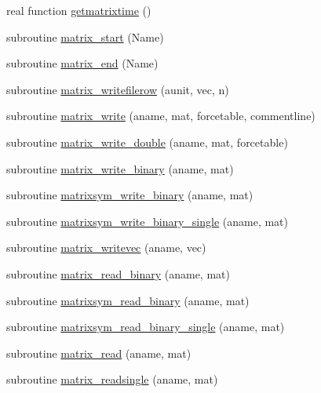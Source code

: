 \begin{DoxyCompactItemize}
\item 
real function \mbox{\hyperlink{namespacematrixutils_a969773017c47f3dc8dfb2a18e5bc5fbd}{getmatrixtime}} ()
\item 
subroutine \mbox{\hyperlink{namespacematrixutils_a24fd4fc8dbd7eee3c9176c3f9ca634eb}{matrix\+\_\+start}} (Name)
\item 
subroutine \mbox{\hyperlink{namespacematrixutils_aeb25ca6b661aed4516c029f0cd6003bc}{matrix\+\_\+end}} (Name)
\item 
subroutine \mbox{\hyperlink{namespacematrixutils_a88175f31021d0939c32287595d3f5630}{matrix\+\_\+writefilerow}} (aunit, vec, n)
\item 
subroutine \mbox{\hyperlink{namespacematrixutils_af21f52b4eeb7fc47bb9cd5e35cc1ebc8}{matrix\+\_\+write}} (aname, mat, forcetable, commentline)
\item 
subroutine \mbox{\hyperlink{namespacematrixutils_aa5eb3cbf41718ad7ccb335e642a29174}{matrix\+\_\+write\+\_\+double}} (aname, mat, forcetable)
\item 
subroutine \mbox{\hyperlink{namespacematrixutils_a5897a3508757971da56e07e3cdab7f0a}{matrix\+\_\+write\+\_\+binary}} (aname, mat)
\item 
subroutine \mbox{\hyperlink{namespacematrixutils_ac49e65871c4266da9c687b474d1908d8}{matrixsym\+\_\+write\+\_\+binary}} (aname, mat)
\item 
subroutine \mbox{\hyperlink{namespacematrixutils_acbfa12c533184738072f7f9a35e7cfc7}{matrixsym\+\_\+write\+\_\+binary\+\_\+single}} (aname, mat)
\item 
subroutine \mbox{\hyperlink{namespacematrixutils_a122e85102b3eac4266a8031c62de9bbf}{matrix\+\_\+writevec}} (aname, vec)
\item 
subroutine \mbox{\hyperlink{namespacematrixutils_a311afaea7a3204cc1b47a2adb7bebe63}{matrix\+\_\+read\+\_\+binary}} (aname, mat)
\item 
subroutine \mbox{\hyperlink{namespacematrixutils_a7572f4e0a0c8b958126d5d3c8b46f16a}{matrixsym\+\_\+read\+\_\+binary}} (aname, mat)
\item 
subroutine \mbox{\hyperlink{namespacematrixutils_a592726195f2a952a006391bde92cd2b0}{matrixsym\+\_\+read\+\_\+binary\+\_\+single}} (aname, mat)
\item 
subroutine \mbox{\hyperlink{namespacematrixutils_ac778ea47bab010c70f3d6f00838e4668}{matrix\+\_\+read}} (aname, mat)
\item 
subroutine \mbox{\hyperlink{namespacematrixutils_a6c4f5774cfa213609562eb2a5dfeca92}{matrix\+\_\+readsingle}} (aname, mat)

\end{DoxyCompactItemize}
